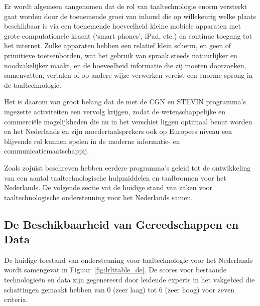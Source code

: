 \begin{multicols}{2}
  Er wordt algemeen aangenomen dat de rol van taaltechnologie enorm versterkt gaat worden door de toenemende groei van inhoud die op willekeurig welke plaats beschikbaar is via een toenemende hoeveelheid kleine mobiele apparaten met grote computationele kracht (`smart phones', iPad, etc.) en continue toegang tot het internet. Zulke apparaten hebben een relatief klein scherm, en geen of primitieve toetsenborden, wat het gebruik van spraak steeds natuurlijker en noodzakelijker maakt, en de hoeveelheid informatie die zij moeten doorzoeken, samenvatten, vertalen of op andere wijze verwerken vereist een enorme sprong in de taaltechnologie.

  Het is daarom van groot belang dat de met de CGN en STEVIN programma's ingezette activiteiten een vervolg krijgen, zodat de wetenschappelijke en commerci{\"e}le mogelijkheden die nu in het verschiet liggen optimaal benut worden en het Nederlands en zijn moedertaalsprekers ook op Europees niveau een blijvende rol kunnen spelen in de moderne informatie- en communicatiemaatschappij.

Zoals zojuist beschreven hebben eerdere programma's geleid tot de ontwikkeling van een aantal taaltechnologische hulpmiddelen en taalbronnen voor het Nederlands. De volgende sectie vat de huidige stand van zaken voor taaltechnologische ondersteuning voor het Nederlands samen.

\subsection{De Beschikbaarheid van Gereedschappen en Data}

    De huidige toestand van ondersteuning voor taaltechnologie voor het Nederlands wordt samengevat in Figuur~\ref{fig:lrlttable_de}. De scores voor bestaande technologie\"{e}n en data zijn gegenereerd door leidende experts in het vakgebied die schattingen gemaakt hebben van 0 (zeer laag) tot 6 (zeer hoog) voor zeven criteria.



\end{multicols}
